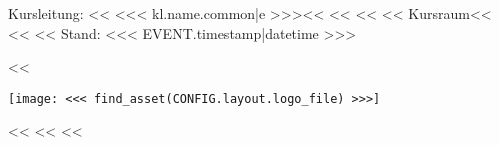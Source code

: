         \vspace*{\fill}
        \begin{minipage}[b]{\textwidth-2.5cm}%
            Kursleitung:
            <<%
                <<< kl.name.common|e >>><<%
            <<%
            <<%
                <<%
                    Kursraum<<%
                <<%
            <<%
            Stand: <<< EVENT.timestamp|datetime >>>
        \end{minipage}%
        \hspace{0.5cm}%
        <<%
            \begin{minipage}[b][2cm][b]{2cm}%
                \texttt{[image: <<< find\_asset(CONFIG.layout.logo\_file) >>>]}
            \end{minipage}%
        <<%
        \pagebreak
    <<%
<<%
